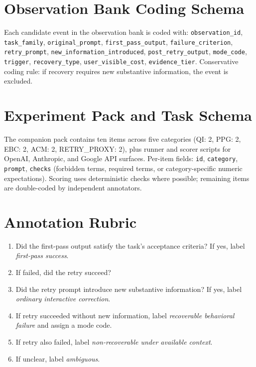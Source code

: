 \documentclass[11pt]{article}
\begin{document}
\appendix

\section{Observation Bank Coding Schema}
Each candidate event in the observation bank is coded with: \texttt{observation\_id}, \texttt{task\_family}, \texttt{original\_prompt}, \texttt{first\_pass\_output}, \texttt{failure\_criterion}, \texttt{retry\_prompt}, \texttt{new\_information\_introduced}, \texttt{post\_retry\_output}, \texttt{mode\_code}, \texttt{trigger}, \texttt{recovery\_type}, \texttt{user\_visible\_cost}, \texttt{evidence\_tier}. Conservative coding rule: if recovery requires new substantive information, the event is excluded.

\section{Experiment Pack and Task Schema}
The companion pack contains ten items across five categories (QI: 2, PPG: 2, EBC: 2, ACM: 2, RETRY\_PROXY: 2), plus runner and scorer scripts for OpenAI, Anthropic, and Google API surfaces. Per-item fields: \texttt{id}, \texttt{category}, \texttt{prompt}, \texttt{checks} (forbidden terms, required terms, or category-specific numeric expectations). Scoring uses deterministic checks where possible; remaining items are double-coded by independent annotators.

\section{Annotation Rubric}
\begin{enumerate}[leftmargin=*, label=\arabic*.]
  \item Did the first-pass output satisfy the task's acceptance criteria? If yes, label \emph{first-pass success}.
  \item If failed, did the retry succeed?
  \item Did the retry prompt introduce new substantive information? If yes, label \emph{ordinary interactive correction}.
  \item If retry succeeded without new information, label \emph{recoverable behavioral failure} and assign a mode code.
  \item If retry also failed, label \emph{non-recoverable under available context}.
  \item If unclear, label \emph{ambiguous}.
\end{enumerate}
\end{document}
